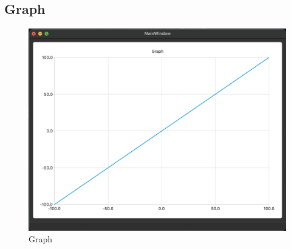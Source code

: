 \documentclass[]{article}
\begin{document}
\hypertarget{graph}{\subsection{Graph}\label{graph}}

\begin{figure}[htbp]
\centering
\includegraphics{pics/graph.png}
\caption{Graph}
\end{figure}
\end{document}
